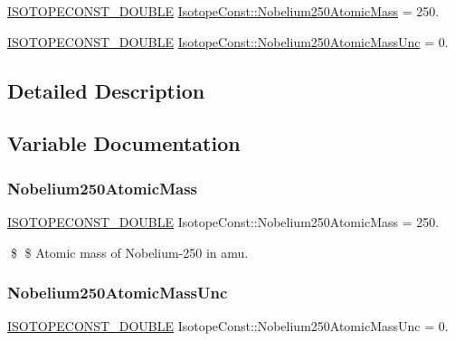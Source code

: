 \begin{DoxyCompactItemize}
\item 
\mbox{\hyperlink{group___isotope_const-_macros_ga8f45a7272ce02c0b4c65c44636ed719a}{I\+S\+O\+T\+O\+P\+E\+C\+O\+N\+S\+T\+\_\+\+D\+O\+U\+B\+LE}} \mbox{\hyperlink{group___isotope_const-_nobelium-_no250_gaefdced57b5cc4e9404a45072318093d5}{Isotope\+Const\+::\+Nobelium250\+Atomic\+Mass}} = 250.
\item 
\mbox{\hyperlink{group___isotope_const-_macros_ga8f45a7272ce02c0b4c65c44636ed719a}{I\+S\+O\+T\+O\+P\+E\+C\+O\+N\+S\+T\+\_\+\+D\+O\+U\+B\+LE}} \mbox{\hyperlink{group___isotope_const-_nobelium-_no250_ga44e4e35d13b820658a883b9a4259c9f2}{Isotope\+Const\+::\+Nobelium250\+Atomic\+Mass\+Unc}} = 0.
\end{DoxyCompactItemize}


\subsection{Detailed Description}


\subsection{Variable Documentation}
\mbox{\label{group___isotope_const-_nobelium-_no250_gaefdced57b5cc4e9404a45072318093d5}} 
\subsubsection{\texorpdfstring{Nobelium250\+Atomic\+Mass}{Nobelium250AtomicMass}}
{\footnotesize\ttfamily \mbox{\hyperlink{group___isotope_const-_macros_ga8f45a7272ce02c0b4c65c44636ed719a}{I\+S\+O\+T\+O\+P\+E\+C\+O\+N\+S\+T\+\_\+\+D\+O\+U\+B\+LE}} Isotope\+Const\+::\+Nobelium250\+Atomic\+Mass = 250.}

\$ \$ Atomic mass of Nobelium-\/250 in amu. \mbox{\label{group___isotope_const-_nobelium-_no250_ga44e4e35d13b820658a883b9a4259c9f2}} 
\subsubsection{\texorpdfstring{Nobelium250\+Atomic\+Mass\+Unc}{Nobelium250AtomicMassUnc}}
{\footnotesize\ttfamily \mbox{\hyperlink{group___isotope_const-_macros_ga8f45a7272ce02c0b4c65c44636ed719a}{I\+S\+O\+T\+O\+P\+E\+C\+O\+N\+S\+T\+\_\+\+D\+O\+U\+B\+LE}} Isotope\+Const\+::\+Nobelium250\+Atomic\+Mass\+Unc = 0.}

